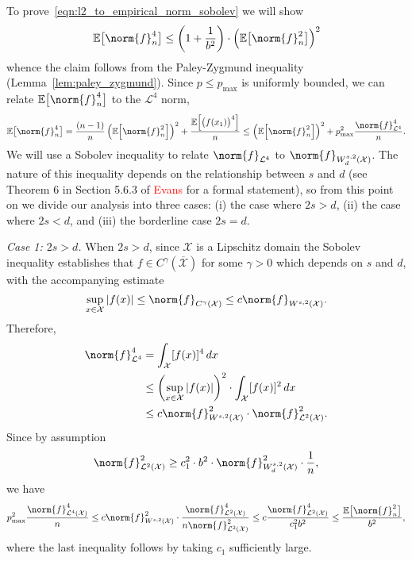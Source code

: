 \documentclass{article}
\newcommand{\abs}[1]{\left \lvert #1 \right \rvert}
\newcommand{\1}{\mathbf{1}}
\newcommand{\Xset}{\mathcal{X}}
\newcommand{\Leb}{\mathcal{L}}
\newcommand{\Ebb}{\mathbb{E}}
\theoremstyle{alden}
\theoremstyle{aldenthm}
\theoremstyle{definition}
\theoremstyle{remark}
\begin{document}
To prove~\eqref{eqn:l2_to_empirical_norm_sobolev} we will show
\begin{equation*}
\mathbb{E}\bigl[\norm{f}_n^4\bigr] \leq \left(1 + \frac{1}{b^2}\right)\cdot \left(\mathbb{E}\bigl[\norm{f}_n^2\bigr]\right)^2
\end{equation*}
whence the claim follows from the Paley-Zygmund inequality (Lemma~\ref{lem:paley_zygmund}). Since $p \leq p_{\max}$ is uniformly bounded, we can relate $\mathbb{E}\bigl[\norm{f}_n^4\bigr]$ to the $\Leb^4$ norm,
\begin{equation*}
\mathbb{E}\bigl[\norm{f}_n^4\bigr] = \frac{(n-1)}{n}\left(\mathbb{E}\Bigl[\norm{f}_n^2\Bigr]\right)^2 + \frac{\mathbb{E}\Bigl[\bigl(f(x_1)\bigr)^4\Bigr]}{n} \leq \left(\mathbb{E}\Bigl[\norm{f}_n^2\Bigr]\right)^2 + p_{\max}^2\frac{\norm{f}_{\Leb^4}^4}{n}.
\end{equation*}
We will use a Sobolev inequality to relate $\norm{f}_{\Leb^4}$ to $\norm{f}_{W_d^{s,2}(\Xset)}$. The nature of this inequality depends on the relationship between $s$ and $d$ (see Theorem 6 in Section 5.6.3 of \textcolor{red}{Evans} for a formal statement), so from this point on we divide our analysis into three cases: (i) the case where $2s > d$, (ii) the case where $2s < d$, and (iii) the borderline case $2s = d$.

\textit{Case 1: $2s > d$.}
When $2s > d$, since $\Xset$ is a Lipschitz domain the Sobolev inequality establishes that $f \in C^{\gamma}(\overline{\Xset})$ for some $\gamma > 0$ which depends on $s$ and $d$, with the accompanying estimate
\begin{equation*}
\sup_{x \in \Xset} \abs{f(x)} \leq \norm{f}_{C^{\gamma}(\Xset)} \leq c \norm{f}_{W^{s,2}(\Xset)}.
\end{equation*}
Therefore,
\begin{align*}
\norm{f}_{\Leb^4}^4 & = \int_{\Xset} [f(x)]^4 \,dx \\
& \leq \left(\sup_{x \in \Xset} \abs{f(x)}\right)^2 \cdot \int_{\Xset} [f(x)]^2 \,dx \\
& \leq c \norm{f}_{W^{s,2}(\Xset)}^2 \cdot \norm{f}_{\Leb^2(\Xset)}^2.
\end{align*}
Since by assumption
\begin{equation*}
\norm{f}_{\Leb^2(\Xset)}^2 \geq c_1^2 \cdot b^2 \cdot \norm{f}_{W_d^{s,2}(\Xset)}^2 \cdot \frac{1}{n},
\end{equation*}
we have
\begin{equation*}
p_{\max}^2\frac{\norm{f}_{\Leb^4(\Xset)}^4}{n} \leq c \norm{f}_{W^{s,2}(\Xset)}^2 \cdot \frac{\norm{f}_{\Leb^2(\Xset)}^4}{n \norm{f}_{\Leb^2(\Xset)}^2} \leq c \frac{\norm{f}_{\Leb^2(\Xset)}^4}{c_1^2 b^2} \leq \frac{\Ebb\bigl[\norm{f}_n^2\bigr]}{b^2},
\end{equation*}
where the last inequality follows by taking $c_1$ sufficiently large.
\end{document}
